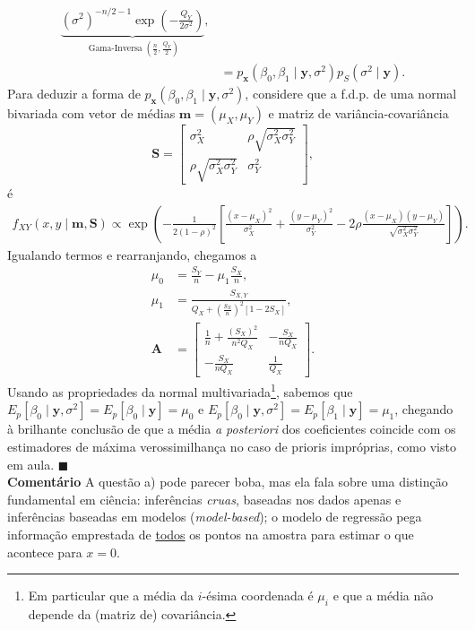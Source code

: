 {\begin{align}
 \nonumber
 \underbrace{(\sigma^2)^{-n/2-1} \exp\left(-\frac{Q_Y}{2\sigma^2}\right)}_{\operatorname{Gama-Inversa}(\frac{n}{2}, \frac{Q_Y}{2})},\\
 \label{eq:nig_post}
  &= p_{\boldsymbol{x}}(\beta_0, \beta_1 \mid \boldsymbol{y}, \sigma^2)p_S(\sigma^2 \mid \boldsymbol{y}).
\end{align}
Para deduzir a forma de $p_{\boldsymbol{x}}(\beta_0, \beta_1 \mid \boldsymbol{y}, \sigma^2)$, considere que a f.d.p. de uma normal bivariada com vetor de médias $\boldsymbol{m} = (\mu_X, \mu_Y)$ e matriz de variância-covariância
\begin{equation*}
\boldsymbol{S} =  \begin{bmatrix}
 \sigma_X^2 & \rho\sqrt{\sigma_X^2\sigma_Y^2}\\
 \rho\sqrt{\sigma_X^2\sigma_Y^2} & \sigma_Y^2
\end{bmatrix},
\end{equation*}
é
\begin{align*}
    f_{XY}(x, y \mid \boldsymbol{m}, \boldsymbol{S}) \propto \exp\left(-\frac{1}{2(1-\rho)^2}\left[\frac{(x-\mu_X)^2}{\sigma_X^2} + \frac{(y-\mu_Y)^2}{\sigma_Y^2} - 2\rho\frac{(x-\mu_X)(y-\mu_Y)}{\sqrt{\sigma_X^2\sigma_Y^2}}\right]\right).
\end{align*}
Igualando termos e rearranjando, chegamos a
\begin{align*}
    \mu_0 & = \frac{S_Y}{n} - \mu_1\frac{S_X}{n}, \\
    \mu_1 & = \frac{S_{X,Y}}{Q_X + \left(\frac{S_X}{n}\right)^2 \left[1 - 2S_X\right]},\\
 \boldsymbol{A} &=  \begin{bmatrix}
 \frac{1}{n} + \frac{(S_X)^2}{n^2Q_X}& -\frac{S_X}{nQ_X}\\
 -\frac{S_X}{nQ_X} & \frac{1}{Q_X}
\end{bmatrix}.
\end{align*}
Usando as propriedades da normal multivariada\footnote{Em particular que a média da $i$-ésima coordenada é $\mu_i$ e que a média não depende da (matriz de) covariância.}, sabemos que $E_p[\beta_0 \mid \boldsymbol{y}, \sigma^2] = E_p[\beta_0 \mid \boldsymbol{y}] = \mu_0$ e $E_p[\beta_0 \mid \boldsymbol{y}, \sigma^2] = E_p[\beta_1 \mid \boldsymbol{y}] = \mu_1$, chegando à brilhante conclusão de que a média \textit{a posteriori} dos coeficientes coincide com os estimadores de máxima verossimilhança no caso de prioris impróprias, como visto em aula.
$\blacksquare$\\
\textbf{Comentário} A questão a) pode parecer boba, mas ela fala sobre uma distinção fundamental em ciência: inferências \textit{cruas}, baseadas nos dados apenas e inferências baseadas em modelos (\textit{model-based}); o modelo de regressão pega informação emprestada de \underline{todos} os pontos na amostra para estimar o que acontece para $x = 0$.
}
